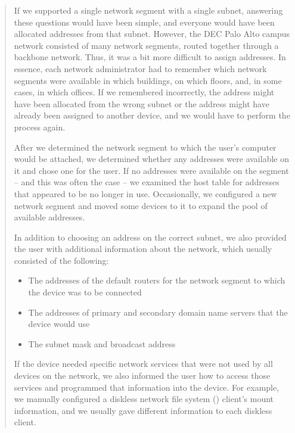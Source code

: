 \begin{quotation}
If we supported a single network segment with a single  subnet, answering these questions would have been simple, and everyone would have been allocated addresses from that subnet.
However, the DEC Palo Alto campus network consisted of many network segments, routed together through a backbone network.
Thus, it was a bit more difficult to assign  addresses.
In essence, each network administrator had to remember which network segments were available in which buildings, on which floors, and, in some cases, in which offices.
If we remembered incorrectly, the address might have been allocated from the wrong subnet or the address might have already been assigned to another device, and we would have to perform the process again.

After we determined the network segment to which the user's computer would be attached, we determined whether any  addresses were available on it and chose one for the user.
If no  addresses were available on the segment -- and this was often the case -- we examined the host table for addresses that appeared to be no longer in use.
Occasionally, we configured a new network segment and moved some devices to it to expand the pool of available addresses.

In addition to choosing an  address on the correct subnet, we also provided the user with additional information about the network, which usually consisted of the following:
\begin{itemize}
\item The addresses of the default routers for the network segment to which the device was to be connected
\item The addresses of primary and secondary domain name servers that the device would use
\item The subnet mask and broadcast address
\end{itemize}
If the device needed specific network services that were not used by all devices on the network, we also informed the user how to access those services and programmed that information into the device.
For example, we manually configured a diskless network file system () client's  mount information, and we usually gave different information to each diskless  client.

\end{quotation}